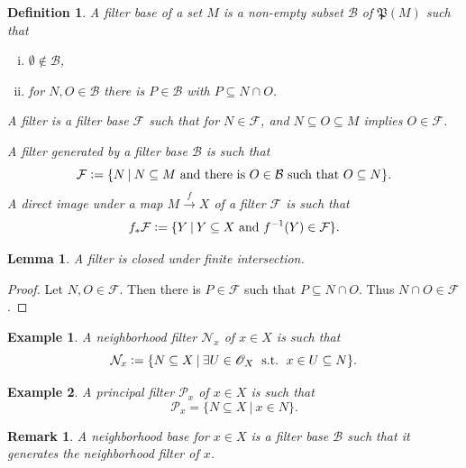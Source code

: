 \documentclass[8pt]{article}
\numberwithin{equation}{section}
\newtheorem{definition}{Definition}[subsection]
\newtheorem{lemma}{Lemma}[subsection]
\newtheorem{remark}{Remark}[subsection]
\newtheorem{example}{Example}[subsection]
\DeclareMathOperator{\straw}{s.t.}
\newcommand{\defeq}{\vcentcolon=}
\newcommand{\Ouv}{\mathscr{O}}
\newcommand{\F}[0]{\mathcal{F}}
\newcommand{\sep}[0]{\:|\:}
\newcommand{\st}[0]{\:\straw\:}
\begin{document}
\begin{definition}
    A filter base of a set $M$ is a non-empty subset $\mathcal{B}$ of $\mathfrak{P}(M)$ such that 
    \begin{enumerate}[i.]
        \item $\emptyset\not\in\mathcal{B}$, 
        \item for $N,O\in\mathcal{B}$ there is $P\in\mathcal{B}$ with $P\subseteq N\cap O$.
    \end{enumerate}
    A filter is a filter base $\mathcal{F}$ such that for $N\in\mathcal{F}$, and $N\subseteq O\subseteq M$ implies $O\in\mathcal{F}$.
    \par A filter generated by a filter base $\mathcal{B}$ is such that 
    \begin{equation*}
        \mathcal{F} \defeq \{N\sep N\subseteq M\text{ and there is $O\in\mathcal{B}$ such that $O\subseteq N$}\}.
    \end{equation*}
    A direct image under a map $M\stackrel{f}{\to}X$ of a filter $\mathcal{F}$ is such that 
    \begin{equation*}
        f_*\mathcal{F}\defeq\{Y\sep Y\subseteq X \text{ and } f^{-1}(Y)\in\mathcal{F}\}.
    \end{equation*}
\end{definition}
\begin{lemma}
    A filter is closed under finite intersection.
\end{lemma}
\begin{proof}
    Let $N,O\in\mathcal{F}$. Then there is $P\in\mathcal{F}$ such that $P\subseteq N\cap O$. Thus $N\cap O\in\F$.
\end{proof}
\begin{example}
    \label{example_2}
A neighborhood filter $\mathcal{N}_x$ of $x\in X$ is such that 
\begin{equation*}
    \mathcal{N}_x\defeq\{N\subseteq X\sep \exists U\in\Ouv_X\:\st\: x\in U\subseteq N\}.
\end{equation*}
\end{example}
\begin{example}
    \label{example_3}
    A principal filter $\mathcal{P}_x$ of $x\in X$ is such that 
    \begin{equation*}
        \mathcal{P}_x=\{N\subseteq X\sep x\in N\}.
    \end{equation*}
\end{example}
\begin{remark}
    A neighborhood base for $x\in X$ is a filter base $\mathcal{B}$ such that it generates the neighborhood filter of $x$.
\end{remark}
\end{document}
